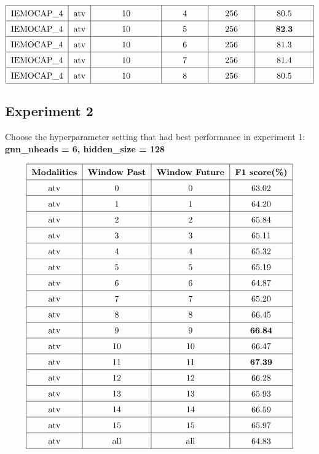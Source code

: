 \documentclass[a4paper]{article}
\begin{document}
\begin{itemize}
\[\begin{tabular}{|c|c|p{2.5cm}<{\centering}|p{1.5cm}<{\centering}|p{1.5cm}<{\centering}|p{2cm}<{\centering}|}
            \hline
            \text{IEMOCAP\_4} & \text{atv} & 10 & 4 & 256 & 80.5 \\
            \hline
            \text{IEMOCAP\_4} & \text{atv} & 10 & 5 & 256 & \(\mathbf{82.3}\) \\
            \hline
            \text{IEMOCAP\_4} & \text{atv} & 10 & 6 & 256 & 81.3 \\
            \hline
            \text{IEMOCAP\_4} & \text{atv} & 10 & 7 & 256 & 81.4 \\
            \hline
            \text{IEMOCAP\_4} & \text{atv} & 10 & 8 & 256 & 80.5 \\
            \hline
        \end{tabular}    
        \]
\end{itemize}

\newpage
\subsection{Experiment 2}
Choose the hyperparameter setting that had best performance in experiment 1: 
\\ \noindent \textbf{gnn\_nheads = 6, hidden\_size = 128} 

\[
\renewcommand{\arraystretch}{1.5}
\begin{tabular}{|c|c|c|c|}
    \hline
    \textbf{Modalities} & \textbf{Window Past} & \textbf{Window Future} & \textbf{F1 score(\%)} \\
    \hline
    \text{atv} & 0 & 0 & 63.02 \\
    \hline
    \text{atv} & 1 & 1 & 64.20 \\
    \hline
    \text{atv} & 2 & 2 & 65.84 \\
    \hline
    \text{atv} & 3 & 3 & 65.11 \\
    \hline
    \text{atv} & 4 & 4 & 65.32 \\
    \hline
    \text{atv} & 5 & 5 & 65.19 \\
    \hline
    \text{atv} & 6 & 6 & 64.87 \\
    \hline
    \text{atv} & 7 & 7 & 65.20 \\
    \hline
    \text{atv} & 8 & 8 & 66.45 \\
    \hline
    \text{atv} & 9 & 9 & \(\mathbf{66.84}\) \\
    \hline
    \text{atv} & 10 & 10 & 66.47 \\
    \hline
    \text{atv} & 11 & 11 & \(\mathbf{67.39}\) \\
    \hline
    \text{atv} & 12 & 12 & 66.28 \\
    \hline
    \text{atv} & 13 & 13 & 65.93 \\
    \hline
    \text{atv} & 14 & 14 & 66.59 \\
    \hline
    \text{atv} & 15 & 15 & 65.97 \\
    \hline
    \text{atv} & \text{all} & \text{all} & 64.83 \\
    \hline
\end{tabular}
\]
\end{document}
